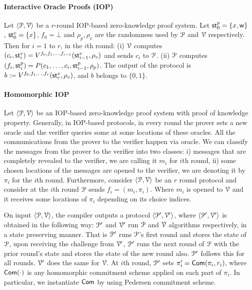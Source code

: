 \paragraph*{Interactive Oracle Proofs (IOP)} Let $\langle \mathcal{P},\mathcal{V}\rangle$ be a $r$-round IOP-based zero-knowledge proof system. Let $\mathsf{st}^p_0 = \{{x}, \mathsf{w}\}$, $\mathsf{st}^v_0 = \{{x}\}$, $f_0 = \bot$ and $\rho_p, \rho_v$ are the randomness used by $\mathcal{P}$ and $\mathcal{V}$ respectively.
Then for $i = 1$ to $r$, in the $i$th round: (i) $\mathcal{V}$ computes $(c_i,\mathsf{st}^v_i) = V^{f_0, f_1, \ldots, f_{i-1}}(\mathsf{st}^v_{i-1}, \rho_v)$ and sends $c_i$ to $\mathcal{P}$. 
(ii) $\mathcal{P}$ computes $(f_i, \mathsf{st}^p_i) = P(c_1, \ldots, c_i, \mathsf{st}^p_{i-1}, \rho_p)$.
The output of the protocol is $b := V^{f_0, f_1, \ldots, f_{r}}(\mathsf{st}^v_{r}, \rho_v)$, and $b$ belongs to $\{0,1\}$.

\paragraph*{Homomorphic IOP} Let $\langle \mathcal{P},\mathcal{V}\rangle$ be an IOP-based zero-knowledge proof system with proof of knowledge property. Generally, in IOP-based protocols, in every round the prover sets a new oracle and the verifier queries some at some locations of these oracles. All the communications from the prover to the verifier happen via oracle. We can classify the messages from the prover to the verifier into two classes: i) messages that are completely revealed to the verifier, we are calling it $m_i$ for $i$th round, ii) some chosen locations of the messages are opened to the verifier, we are denoting it by $\pi_i$ for the $i$th round.
Furthermore, consider $\langle \mathcal{P},\mathcal{V}\rangle$ be an $r$ round protocol and consider at the $i$th round $\mathcal{P}$ sends $f_i = (m_i, \pi_i)$. Where $m_i$ is opened to $\mathcal{V}$ and it receives some locations of $\pi_i$ depending on its choice indices. 

On input $\langle \mathcal{P},\mathcal{V}\rangle$, the compiler outputs a protocol $\langle \mathcal{P}',\mathcal{V}'\rangle$, where $\langle \mathcal{P}',\mathcal{V}'\rangle$ is obtained in the following way: $\mathcal{P}'$ and $\mathcal{V}'$ run $\mathcal{P}$ and $\mathcal{V}$ algorithms respectively, in a state preserving manner. That is $\mathcal{P}'$ runs $\mathcal{P}$'s first round and stores the state of $\mathcal{P}$, upon receiving the challenge from $\mathcal{V}'$, $\mathcal{P}'$ runs the next round of $\mathcal{P}$ with the prior round's state and stores the state of the new round also. $\mathcal{P}'$ follows this for all rounds. $\mathcal{V}'$ does the same for $\mathcal{V}$. 
At $i$th round, $\mathcal{P}'$ sets $\pi'_i = \mathsf{Com}(\pi_i, r_i)$, where $\mathsf{Com}(\cdot)$ is any homomorphic commitment scheme applied on each part of $\pi_i$. In particular, we instantiate $\mathsf{Com}$ by using Pedersen commitment scheme. 

